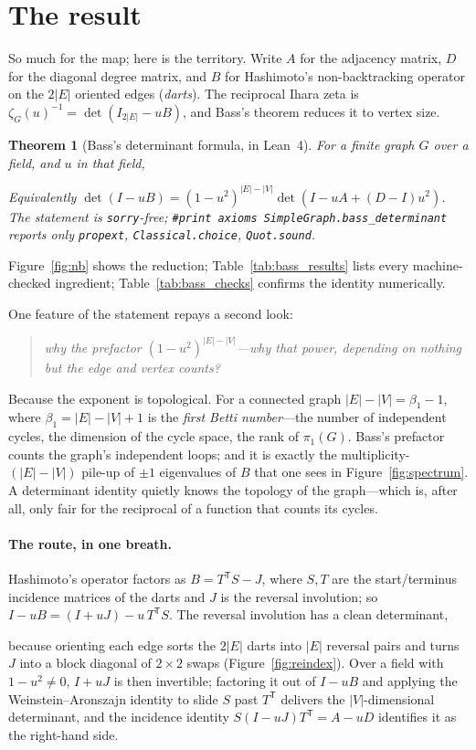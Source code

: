 \documentclass[11pt]{article}
\newtheorem{theorem}{Theorem}
\newcommand{\lean}[1]{\texttt{#1}}
\newcommand{\keyeq}[1]{\begin{center}\keybox{$\displaystyle #1$}\end{center}}
\begin{document}
\section{The result}
\label{sec:result}

So much for the map; here is the territory. Write $A$ for the adjacency matrix, $D$ for the diagonal
degree matrix, and $B$ for Hashimoto's non-backtracking operator on the $2|E|$ oriented edges
(\emph{darts}). The reciprocal Ihara zeta is $\zeta_G(u)^{-1}=\det(I_{2|E|}-uB)$, and Bass's theorem
reduces it to vertex size.

\begin{theorem}[Bass's determinant formula, in Lean~4]
\label{thm:bass}
For a finite graph $G$ over a field, and $u$ in that field,
\keyeq{(1-u^2)^{|V|}\,\det\!\bigl(I-uB\bigr)\;=\;(1-u^2)^{|E|}\,\det\!\bigl(I-uA+u^2(D-I)\bigr).}
Equivalently $\det(I-uB)=(1-u^2)^{|E|-|V|}\det(I-uA+(D-I)u^2)$. The statement is \lean{sorry}-free;
\lean{\#print axioms SimpleGraph.bass\_determinant} reports only \lean{propext},
\lean{Classical.choice}, \lean{Quot.sound}.
\end{theorem}

Figure~\ref{fig:nb} shows the reduction; Table~\ref{tab:bass_results} lists every machine-checked
ingredient; Table~\ref{tab:bass_checks} confirms the identity numerically.

One feature of the statement repays a second look:
\begin{quote}\itshape
  why the prefactor $(1-u^2)^{|E|-|V|}$---why \emph{that} power, depending on nothing but the edge
  and vertex counts?
\end{quote}
Because the exponent is topological. For a connected graph $|E|-|V|=\beta_1-1$, where
$\beta_1=|E|-|V|+1$ is the \emph{first Betti number}---the number of independent cycles, the
dimension of the cycle space, the rank of $\pi_1(G)$. Bass's prefactor counts the graph's
independent loops; and it is exactly the multiplicity-$(|E|-|V|)$ pile-up of $\pm1$ eigenvalues of
$B$ that one sees in Figure~\ref{fig:spectrum}. A determinant identity quietly knows the topology of
the graph---which is, after all, only fair for the reciprocal of a function that counts its cycles.

\paragraph{The route, in one breath.}
Hashimoto's operator factors as $B=T^{\mathsf T}S-J$, where $S,T$ are the start/terminus incidence
matrices of the darts and $J$ is the reversal involution; so $I-uB=(I+uJ)-u\,T^{\mathsf T}S$. The
reversal involution has a clean determinant,
\keyeq{\det(I+uJ)\;=\;(1-u^2)^{|E|},}
because orienting each edge sorts the $2|E|$ darts into $|E|$ reversal pairs and turns $J$ into a
block diagonal of $2\times2$ swaps (Figure~\ref{fig:reindex}). Over a field with $1-u^2\neq0$, $I+uJ$
is then invertible; factoring it out of $I-uB$ and applying the Weinstein--Aronszajn identity to
slide $S$ past $T^{\mathsf T}$ delivers the $|V|$-dimensional determinant, and the incidence identity
$S(I-uJ)T^{\mathsf T}=A-uD$ identifies it as the right-hand side.
\end{document}
